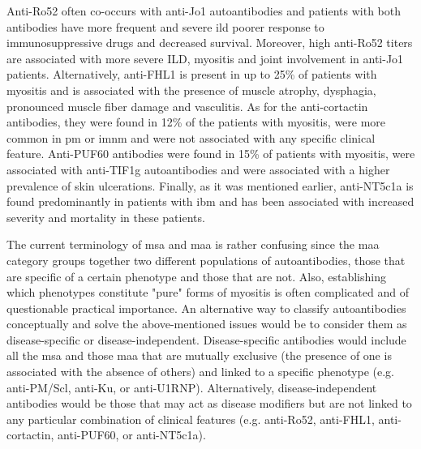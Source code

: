 Anti-Ro52 often co-occurs with anti-Jo1 autoantibodies and patients with both antibodies have more frequent and severe \gls{ild} poorer response to immunosuppressive drugs and decreased survival.\cite{PinalFernandez2017a,Vancsa2009,Bauhammer2016,Marie2012} Moreover, high anti-Ro52 titers are associated with more severe ILD, myositis and joint involvement in anti-Jo1 patients.\cite{PinalFernandez2017a,Vancsa2009,Bauhammer2016,Marie2012} Alternatively, anti-FHL1 is present in up to 25\% of patients with myositis and is associated with the presence of muscle atrophy, dysphagia, pronounced muscle fiber damage and vasculitis.\cite{Albrecht2015} As for the anti-cortactin antibodies, they were found in 12\% of the patients with myositis, were more common in \gls{pm} or \gls{imnm} and were not associated with any specific clinical feature.\cite{LabradorHorrillo2014a} Anti-PUF60 antibodies were found in 15\% of patients with myositis, were associated with anti-TIF1g autoantibodies and were associated with a higher prevalence of skin ulcerations.\cite{Fiorentino2016,Zhang2018} Finally, as it was mentioned earlier, anti-NT5c1a is found predominantly in patients with \gls{ibm} and has been associated with increased severity and mortality in these patients.\cite{Lloyd2016,Herbert2016,Muro2017,Lilleker2017,Goyal2016}

The current terminology of \gls{msa} and \gls{maa} is rather confusing since the \gls{maa} category groups together two different populations of autoantibodies, those that are specific of a certain phenotype and those that are not. Also, establishing which phenotypes constitute "pure" forms of myositis is often complicated and of questionable practical importance. An alternative way to classify autoantibodies conceptually and solve the above-mentioned issues would be to consider them as disease-specific or disease-independent. Disease-specific antibodies would include all the \gls{msa} and those \gls{maa} that are mutually exclusive (the presence of one is associated with the absence of others) and linked to a specific phenotype (e.g. anti-PM/Scl, anti-Ku, or anti-U1RNP). Alternatively, disease-independent antibodies would be those that may act as disease modifiers but are not linked to any particular combination of clinical features (e.g. anti-Ro52, anti-FHL1, anti-cortactin, anti-PUF60, or anti-NT5c1a).

